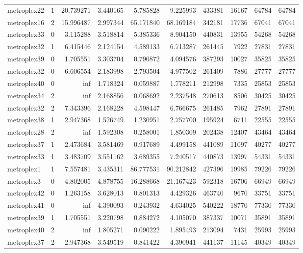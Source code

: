\begin{longtable}{|l|r|r|r|r|r|r|r|r|r|}
metroplex22 & 1 & 20.739271 & 3.440165 & 5.785828 & 9.225993 & 433381 & 16167 & 64784 & 64784 \\
metroplex16 & 2 & 15.996487 & 2.997344 & 65.171840 & 68.169184 & 342181 & 17736 & 67041 & 67041 \\
metroplex33 & 0 & 3.115288 & 3.518814 & 5.385336 & 8.904150 & 440831 & 13955 & 54268 & 54268 \\
metroplex32 & 1 & 6.415446 & 2.124154 & 4.589133 & 6.713287 & 261445 & 7922 & 27831 & 27831 \\
metroplex39 & 0 & 1.705551 & 3.303704 & 0.790872 & 4.094576 & 387293 & 10027 & 35825 & 35825 \\
metroplex32 & 0 & 6.606554 & 2.183998 & 2.793504 & 4.977502 & 261409 & 7886 & 27777 & 27777 \\
metroplex40 & 0 & inf & 1.718324 & 0.059887 & 1.778211 & 212998 & 7335 & 25853 & 25853 \\
metroplex34 & 2 & inf & 2.168856 & 0.068692 & 2.237548 & 270613 & 8506 & 30425 & 30425 \\
metroplex32 & 2 & 7.343396 & 2.168228 & 4.598447 & 6.766675 & 261485 & 7962 & 27891 & 27891 \\
metroplex38 & 1 & 2.947368 & 1.526749 & 1.230951 & 2.757700 & 195924 & 6711 & 22555 & 22555 \\
metroplex28 & 2 & inf & 1.592308 & 0.258001 & 1.850309 & 202438 & 12407 & 43464 & 43464 \\
metroplex37 & 1 & 2.473684 & 3.581469 & 0.917689 & 4.499158 & 441089 & 11097 & 40277 & 40277 \\
metroplex33 & 1 & 3.483709 & 3.551162 & 3.689355 & 7.240517 & 440873 & 13997 & 54331 & 54331 \\
metroplex1 & 1 & 7.557481 & 3.435311 & 86.777531 & 90.212842 & 427396 & 19985 & 79226 & 79226 \\
metroplex3 & 0 & 4.802005 & 4.878755 & 16.288668 & 21.167423 & 592318 & 16706 & 66949 & 66949 \\
metroplex42 & 0 & 1.263158 & 3.628013 & 0.801313 & 4.429326 & 463740 & 9670 & 33751 & 33751 \\
metroplex41 & 0 & inf & 4.390093 & 0.243932 & 4.634025 & 540222 & 18770 & 77330 & 77330 \\
metroplex39 & 1 & 1.705551 & 3.220798 & 0.884272 & 4.105070 & 387337 & 10071 & 35891 & 35891 \\
metroplex40 & 2 & inf & 1.805271 & 0.090222 & 1.895493 & 213094 & 7431 & 25993 & 25993 \\
metroplex37 & 2 & 2.947368 & 3.549519 & 0.841422 & 4.390941 & 441137 & 11145 & 40349 & 40349 \\

\end{longtable}
